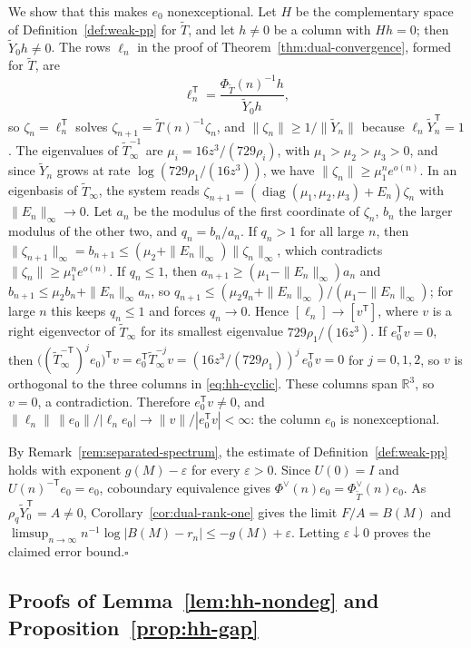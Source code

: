\documentclass[oneside,english,11pt]{amsart}
\begin{document}
We show that this makes $e_0$ nonexceptional. Let $H$ be the complementary space of Definition~\ref{def:weak-pp} for $\tilde T$, and let $h\ne0$ be a column with $Hh=0$; then $\tilde Y_0h\ne0$. The rows $\ell_n$ in the proof of Theorem~\ref{thm:dual-convergence}, formed for $\tilde T$, are
\[
 \ell_n^{\mathsf T}=\frac{\Phi_{\tilde T}(n)^{-1}h}{\tilde Y_0h},
\]
so $\zeta_n=\ell_n^{\mathsf T}$ solves $\zeta_{n+1}=\tilde T(n)^{-1}\zeta_n$, and $\|\zeta_n\|\ge1/\|\tilde Y_n\|$ because $\ell_n\tilde Y_n^{\mathsf T}=1$.
The eigenvalues of $\tilde T_\infty^{-1}$ are $\mu_i=16z^3/(729\rho_i)$, with $\mu_1>\mu_2>\mu_3>0$, and since $\tilde Y_n$ grows at rate $\log(729\rho_1/(16z^3))$, we have $\|\zeta_n\|\ge\mu_1^ne^{o(n)}$.
In an eigenbasis of $\tilde T_\infty$, the system reads $\zeta_{n+1}=(\operatorname{diag}(\mu_1,\mu_2,\mu_3)+E_n)\zeta_n$ with $\|E_n\|_\infty\to0$. Let $a_n$ be the modulus of the first coordinate of $\zeta_n$, $b_n$ the larger modulus of the other two, and $q_n=b_n/a_n$.
If $q_n>1$ for all large $n$, then $\|\zeta_{n+1}\|_\infty=b_{n+1}\le(\mu_2+\|E_n\|_\infty)\|\zeta_n\|_\infty$, which contradicts $\|\zeta_n\|\ge\mu_1^ne^{o(n)}$.
If $q_n\le1$, then $a_{n+1}\ge(\mu_1-\|E_n\|_\infty)a_n$ and $b_{n+1}\le\mu_2b_n+\|E_n\|_\infty a_n$, so $q_{n+1}\le(\mu_2q_n+\|E_n\|_\infty)/(\mu_1-\|E_n\|_\infty)$; for large $n$ this keeps $q_n\le1$ and forces $q_n\to0$.
Hence $[\ell_n]\to[v^{\mathsf T}]$, where $v$ is a right eigenvector of $\tilde T_\infty$ for its smallest eigenvalue $729\rho_1/(16z^3)$.
If $e_0^{\mathsf T}v=0$, then $\bigl((\tilde T_\infty^{-\mathsf T})^je_0\bigr)^{\mathsf T}v=e_0^{\mathsf T}\tilde T_\infty^{-j}v=(16z^3/(729\rho_1))^j\,e_0^{\mathsf T}v=0$ for $j=0,1,2$, so $v$ is orthogonal to the three columns in \eqref{eq:hh-cyclic}. These columns span $\mathbb R^3$, so $v=0$, a contradiction.
Therefore $e_0^{\mathsf T}v\ne0$, and $\|\ell_n\|\,\|e_0\|/|\ell_ne_0|\to\|v\|/|e_0^{\mathsf T}v|<\infty$: the column $e_0$ is nonexceptional.

By Remark~\ref{rem:separated-spectrum}, the estimate of Definition~\ref{def:weak-pp} holds with exponent $g(M)-\varepsilon$ for every $\varepsilon>0$.
Since $U(0)=I$ and $U(n)^{-\mathsf T}e_0=e_0$, coboundary equivalence gives
$\Phi^\vee(n)e_0=\Phi_{\tilde T}^\vee(n)e_0$.
As $\rho_q\tilde Y_0^{\mathsf T}=A\ne0$, Corollary~\ref{cor:dual-rank-one} gives the limit $F/A=B(M)$ and
$\limsup_{n\to\infty}n^{-1}\log|B(M)-r_n|\le-g(M)+\varepsilon$.
Letting $\varepsilon\downarrow0$ proves the claimed error bound.\hfill$\square$

\subsection{Proofs of Lemma~\ref{lem:hh-nondeg} and Proposition~\ref{prop:hh-gap}}\label{app:hh-arith}
\end{document}
